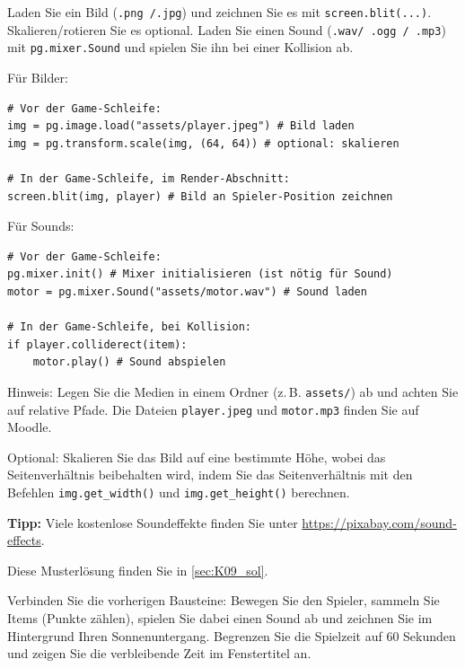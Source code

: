 \begin{myexercise}\label{myexercise:Medien}
    Laden Sie ein Bild (\lstinline|.png /.jpg|) und zeichnen Sie es mit \lstinline|screen.blit(...)|. Skalieren/rotieren Sie es optional. Laden Sie einen Sound (\lstinline|.wav/ .ogg / .mp3|) mit \lstinline|pg.mixer.Sound| und spielen Sie ihn bei einer Kollision ab.

    Für Bilder:
    \begin{lstlisting}
# Vor der Game-Schleife:
img = pg.image.load("assets/player.jpeg") # Bild laden
img = pg.transform.scale(img, (64, 64)) # optional: skalieren

# In der Game-Schleife, im Render-Abschnitt:
screen.blit(img, player) # Bild an Spieler-Position zeichnen
\end{lstlisting}

    Für Sounds:
    \begin{lstlisting}
# Vor der Game-Schleife:
pg.mixer.init() # Mixer initialisieren (ist nötig für Sound)
motor = pg.mixer.Sound("assets/motor.wav") # Sound laden

# In der Game-Schleife, bei Kollision:
if player.colliderect(item):
    motor.play() # Sound abspielen
\end{lstlisting}

    Hinweis: Legen Sie die Medien in einem Ordner (z.\,B. \lstinline|assets/|) ab und achten Sie auf relative Pfade. Die Dateien \texttt{player.jpeg} und \texttt{motor.mp3} finden Sie auf Moodle.

    Optional: Skalieren Sie das Bild auf eine bestimmte Höhe, wobei das Seitenverhältnis beibehalten wird, indem Sie das Seitenverhältnis mit den Befehlen \lstinline|img.get_width()| und \lstinline|img.get_height()| berechnen.

    \textbf{Tipp:} Viele kostenlose Soundeffekte finden Sie unter \url{https://pixabay.com/sound-effects}.
	\begin{myanswer}
		Diese Musterlösung finden Sie in \cref{sec:K09_sol}.
	\end{myanswer}
\end{myexercise}

\begin{mychallenge}
    Verbinden Sie die vorherigen Bausteine: Bewegen Sie den Spieler, sammeln Sie Items (Punkte zählen), spielen Sie dabei einen Sound ab und zeichnen Sie im Hintergrund Ihren Sonnenuntergang. Begrenzen Sie die Spielzeit auf 60 Sekunden und zeigen Sie die verbleibende Zeit im Fenstertitel an.
\end{mychallenge}

